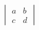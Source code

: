 \documentclass[preview]{standalone}
\begin{document}
\begin{align*}
\begin{vmatrix} a & b \\ c & d \end{vmatrix}
\end{align*}
\end{document}
